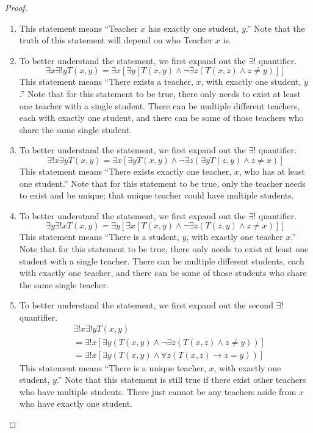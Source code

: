 \documentclass[12pt]{amsart}
\theoremstyle{definition}
\theoremstyle{remark}
\begin{document}
\begin{proof}
\hfill
\begin{enumerate}
	\item This statement means ``Teacher $x$ has exactly one student, $y$.''
	Note that the truth of this statement will depend on who Teacher $x$ is.
	
	\item To better understand the statement, we first expand out the $\exists!$ quantifier.
	\begin{equation*}
		\exists x \exists! y T(x, y)
		= \exists x [\exists y [T(x, y) \wedge \neg \exists z (T(x, z) \wedge z \neq y)]]
	\end{equation*}
	This statement means ``There exists a teacher, $x$, with exactly one student, $y$.''
	Note that for this statement to be true, there only needs to exist at least one teacher with a single student.
	There can be multiple different teachers, each with exactly one student, and
	there can be some of those teachers who share the same single student.
	
	\item To better understand the statement, we first expand out the $\exists!$ quantifier.
	\begin{equation*}
		\exists! x \exists y T(x, y)
		= \exists x [\exists y T(x, y) \wedge \neg \exists z (\exists y T(z, y) \wedge z \neq x)]
	\end{equation*}
	This statement means ``There exists exactly one teacher, $x$, who has at least one student.''
	Note that for this statement to be true, only the teacher needs to exist and be unique;
	that unique teacher could have multiple students.
	
	\item To better understand the statement, we first expand out the $\exists!$ quantifier.
	\begin{equation*}
		\exists y \exists! x T(x, y)
		= \exists y [\exists x [T(x, y) \wedge \neg \exists z (T(z, y) \wedge z \neq x)]]
	\end{equation*}
	This statement means ``There is a student, $y$, with exactly one teacher $x$.''
	Note that for this statement to be true, there only needs to exist at least one student with a single teacher.
	There can be multiple different students, each with exactly one teacher,
	and there can be some of those students who share the same single teacher.
	
	\item To better understand the statement, we first expand out the second $\exists!$ quantifier.
	\begin{align*}
		& \exists! x \exists! y T(x, y) \\
		&= \exists! x [\exists y (T(x, y) \wedge \neg \exists z (T(x, z) \wedge z \neq y))] \\
		&= \exists! x [\exists y (T(x, y) \wedge \forall z (T(x, z) \rightarrow z = y))]
	\end{align*}
	This statement means ``There is a unique teacher, $x$, with exactly one student, $y$.''
	Note that this statement is still true if there exist other teachers who have multiple students.
	There just cannot be any teachers aside from $x$ who have exactly one student.
	

\end{enumerate}
\end{proof}
\end{document}
